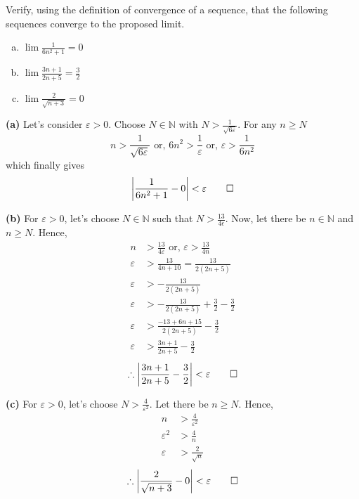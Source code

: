\documentclass[12pt]{article}
\begin{document}
\begin{example}{Verify, using the definition of convergence of a sequence, that the following sequences converge to the proposed limit.
    \begin{enumerate}[(a)]
        \item $\lim \frac{1}{6n^2+1}=0$ 
        \item $\lim \frac{3n+1}{2n+5}=\frac{3}{2}$
        \item $\lim \frac{2}{\sqrt{n+3}}=0$
    \end{enumerate}}
    
    \textbf{(a)} Let's consider $\varepsilon>0$. Choose $N\in\mathbb{N}$ with $N>\frac{1}{\sqrt{6\varepsilon}}$. For any $n \ge N$ \[
        n>\frac{1}{\sqrt{6\varepsilon}} \text{ or, } 6n^2>\frac{1}{\varepsilon} \text{ or, } \varepsilon>\frac{1}{6n^2}
    \] which finally gives \[ \left| \frac{1}{6n^2+1}-0 \right| <\varepsilon \qed \] 

    \textbf{(b)} For $\varepsilon>0$, let's choose $N \in \mathbb{N}$ such that $N>\frac{13}{4\epsilon}$. Now, let there be $n\in \mathbb{N}$ and $n \ge N$. Hence,
    \begin{align*}
        n &> \frac{13}{4\varepsilon} \text{ or, } \varepsilon>\frac{13}{4n} \\
        \varepsilon &> \frac{13}{4n+10} = \frac{13}{2(2n+5)} \\
        \varepsilon &> -\frac{13}{2(2n+5)} \\
        \varepsilon &> -\frac{13}{2(2n+5)}+\frac{3}{2}-\frac{3}{2} \\
        \varepsilon &> \frac{-13+6n+15}{2(2n+5)} - \frac{3}{2} \\
        \varepsilon &> \frac{3n+1}{2n+5} - \frac{3}{2}
    \end{align*}
    \[ \therefore \left| \frac{3n+1}{2n+5} - \frac{3}{2} \right| < \varepsilon \qed \] 

    \textbf{(c)} For $\varepsilon>0$, let's choose $N>\frac{4}{\varepsilon^2}$. Let there be $n \ge N$. Hence,
    \begin{align*}
        n &> \frac{4}{\varepsilon^2} \\
        \varepsilon^2 &> \frac{4}{n} \\
        \varepsilon &> \frac{2}{\sqrt{n}}
    \end{align*} \[  
       \therefore \left| \frac{2}{\sqrt{n+3}} - 0 \right| < \varepsilon \qed
    \] 
\end{example}
\end{document}
